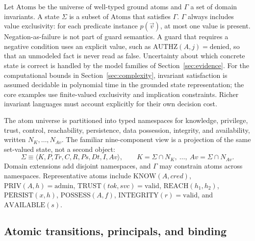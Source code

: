 \documentclass[11pt,letterpaper]{article}
\theoremstyle{definition}
\newcommand{\St}{\Sigma}
\newcommand{\Inv}{\Gamma}
\begin{document}
Let $\mathrm{Atoms}$ be the universe of well-typed ground atoms and $\Inv$ a set of domain invariants. A state $\St$ is a subset of $\mathrm{Atoms}$ that satisfies $\Inv$. $\Inv$ always includes value exclusivity: for each predicate instance $p(\vec v)$, at most one value is present. Negation-as-failure is not part of guard semantics. A guard that requires a negative condition uses an explicit value, such as $\mathrm{AUTHZ}(A,j)=\mathrm{denied}$, so that an unmodeled fact is never read as false. Uncertainty about which concrete state is correct is handled by the model families of Section~\ref{sec:evidence}. For the computational bounds in Section~\ref{sec:complexity}, invariant satisfaction is assumed decidable in polynomial time in the grounded state representation; the core examples use finite-valued exclusivity and implication constraints. Richer invariant languages must account explicitly for their own decision cost.

The atom universe is partitioned into typed namespaces for knowledge, privilege, trust, control, reachability, persistence, data possession, integrity, and availability, written $N_K,\dots,N_{Av}$. The familiar nine-component view is a projection of the same set-valued state, not a second object:
\begin{equation}
\St \equiv \langle K,P,T\!r,C,R,P\!s,D\!t,I,Av\rangle,\qquad K=\St\cap N_K,\ \dots,\ Av=\St\cap N_{Av}.
\end{equation}
Domain extensions add disjoint namespaces, and $\Inv$ may constrain atoms across namespaces. Representative atoms include $\mathrm{KNOW}(A,\mathit{cred})$, $\mathrm{PRIV}(A,h)=\mathrm{admin}$, $\mathrm{TRUST}(\mathit{tok},\mathit{svc})=\mathrm{valid}$, $\mathrm{REACH}(h_1,h_2)$, $\mathrm{PERSIST}(x,h)$, $\mathrm{POSSESS}(A,f)$, $\mathrm{INTEGRITY}(r)=\mathrm{valid}$, and $\mathrm{AVAILABLE}(s)$.

\subsection{Atomic transitions, principals, and binding}
\end{document}
